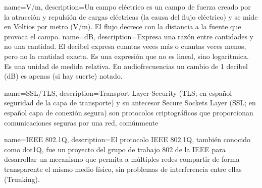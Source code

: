 {
name=V/m,
description={Un campo eléctrico es un campo de fuerza creado por la atracción y repulsión de cargas eléctricas (la causa del flujo eléctrico) y se mide en Voltios por metro (V/m). El flujo decrece con la distancia a la fuente que provoca el campo.}
}
{
name=dB,
description={Expresa una razón entre cantidades y no una cantidad. El decibel expresa cuantas veces más o cuantas veces menos, pero no la cantidad exacta. Es una expresión que no es lineal, sino logarítmica. Es una unidad de medida relativa. En audiofrecuencias un cambio de 1 decibel (dB) es apenas (si hay suerte) notado.}
}


{
name=SSL/TLS,
description={Transport Layer Security (TLS; en español seguridad de la capa de transporte) y su antecesor Secure Sockets Layer (SSL; en español capa de conexión segura) son protocolos criptográficos que proporcionan comunicaciones seguras por una red, comúnmente}
}






{
name=IEEE 802.1Q,
description={El protocolo IEEE 802.1Q, también conocido como dot1Q, fue un proyecto del grupo de trabajo 802 de la IEEE para desarrollar un mecanismo que permita a múltiples redes compartir de forma transparente el mismo medio físico, sin problemas de interferencia entre ellas (Trunking).}
}

